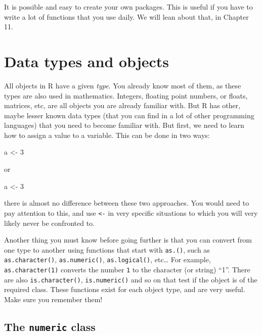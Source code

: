 \documentclass[]{gitbook}
\newenvironment{Shaded}{\begin{snugshade}}{\end{snugshade}}
\newcommand{\DecValTok}[1]{\textcolor[rgb]{0.00,0.00,0.81}{#1}}
\newcommand{\NormalTok}[1]{#1}
\newcommand{\StringTok}[1]{\textcolor[rgb]{0.31,0.60,0.02}{#1}}
\theoremstyle{definition}
\theoremstyle{definition}
\theoremstyle{definition}
\theoremstyle{remark}
\begin{document}
It is possible and easy to create your own packages. This is useful if
you have to write a lot of functions that you use daily. We will lean
about that, in Chapter 11.

\hypertarget{data-types-and-objects}{%
\section{Data types and objects}\label{data-types-and-objects}}

All objects in R have a given \emph{type}. You already know most of
them, as these types are also used in mathematics. Integers, floating
point numbers, or floats, matrices, etc, are all objects you are already
familiar with. But R has other, maybe lesser known data types (that you
can find in a lot of other programming languages) that you need to
become familiar with. But first, we need to learn how to assign a value
to a variable. This can be done in two ways:

\begin{Shaded}
\begin{Highlighting}[]
\NormalTok{a <-}\StringTok{ }\DecValTok{3}
\end{Highlighting}
\end{Shaded}

or

\begin{Shaded}
\begin{Highlighting}[]
\NormalTok{a <-}\StringTok{ }\DecValTok{3}
\end{Highlighting}
\end{Shaded}

there is almost no difference between these two approaches. You would
need to pay attention to this, and use \texttt{\textless{}-} in very
specific situations to which you will very likely never be confronted
to.

Another thing you must know before going further is that you can convert
from one type to another using functions that start with \texttt{as.()},
such as \texttt{as.character()}, \texttt{as.numeric()},
\texttt{as.logical()}, etc\ldots{} For example, \texttt{as.character(1)}
converts the number \texttt{1} to the character (or string) ``1''. There
are also \texttt{is.character()}, \texttt{is.numeric()} and so on that
test if the object is of the required class. These functions exist for
each object type, and are very useful. Make sure you remember them!

\hypertarget{the-numeric-class}{%
\subsection{\texorpdfstring{The \texttt{numeric}
class}{The numeric class}}\label{the-numeric-class}}
\end{document}
